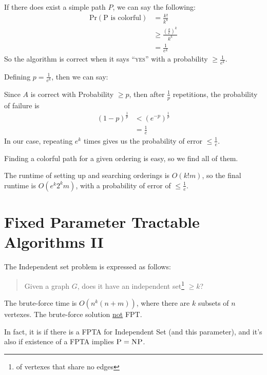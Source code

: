                 If there does exist a simple path $P$, we can say the following:
                \begin{align*}
                    \text{Pr}(\text{P is colorful}) &= \frac{k!}{k^k} \\
                    &\ge \frac{\left( \frac{k}{e} \right)^k}{k^k} \\
                    &= \frac{1}{e^k}
                \end{align*}
                So the algorithm is correct when it says ``\textsc{yes}'' with a probability $\ge \frac{1}{e^k}$.

                Defining $p = \frac{1}{e^k}$, then we can say:

                Since $A$ is correct with Probability $\ge p$, then after $\frac{1}{p}$ repetitions, the probability of failure is
                \begin{align*}
                    (1 - p)^{\frac{1}{p}} &< (e^{-p}) ^ \frac{1}{p} \\
                    &= \frac{1}{e}
                \end{align*}
                In our case, repeating $e^k$ times gives us the probability of error $\le \frac{1}{e}$.

                Finding a colorful path for a given ordering is easy, so we find all of them.

                The runtime of setting up and searching orderings is $O(k! m)$, so the final runtime is $O(e^k 2^k m)$, with a probability of error of $\le \frac{1}{e}$.
        \chapter{Fixed Parameter Tractable Algorithms II} %
        \label{cha:fixed_parameter_tractable_algorithms_ii}
            The Independent set problem is expressed as follows:
            \begin{quotation}
                Given a graph $G$, does it have an independent set\footnote{of vertexes that share no edges} $\ge k$?
            \end{quotation}
            The brute-force time is $O(n^k (n+m))$, where there are $k$ subsets of $n$ vertexes.
            The brute-force solution \uline{not} FPT.

            In fact, it is \open if there is a FPTA for Independent Set (and this parameter), and it's also \open if existence of a FPTA implies $\textsc{P} = \textsc{NP}$.


